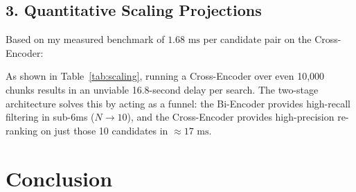 \documentclass[11pt,a4paper]{article}
\begin{document}
\subsection{3. Quantitative Scaling Projections}
Based on my measured benchmark of $1.68\text{ ms}$ per candidate pair on the Cross-Encoder:

\begin{table}[h!]
\centering
\small
{}
\caption{Estimated query latencies showing why full-corpus Cross-Encoding fails at scale.}
\label{tab:scaling}
\end{table}

As shown in Table~\ref{tab:scaling}, running a Cross-Encoder over even 10,000 chunks results in an unviable 16.8-second delay per search. The two-stage architecture solves this by acting as a funnel: the Bi-Encoder provides high-recall filtering in sub-6ms ($N \to 10$), and the Cross-Encoder provides high-precision re-ranking on just those 10 candidates in $\approx 17\text{ ms}$.

\section{Conclusion}
\end{document}

